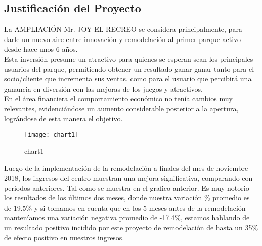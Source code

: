 \documentclass[11pt,a4paper,roman]{article}
\begin{document}
\subsection{Justificación del Proyecto}
La AMPLIACIÓN Mr. JOY EL RECREO se considera principalmente, para darle un nuevo aire entre innovación y remodelación al primer parque activo desde hace unos 6 años.\\[0.25in]
Esta inversión presume un atractivo para quienes se esperan sean  los principales usuarios del parque, permitiendo obtener un resultado ganar-ganar tanto para el socio/cliente que incrementa sus ventas, como para el usuario que percibirá una ganancia en diversión con las mejoras de los juegos y atractivos.\\[0.25in]
En el área financiera el comportamiento económico no tenía cambios muy relevantes, evidenciándose un aumento considerable posterior a la apertura, lográndose de esta manera el objetivo.\\[0.25in]

\begin{figure}[h]
	\centering
	\texttt{[image: chart1]}
	\caption[chart1]{chart1}
	\label{fig:chart1}
\end{figure}

\noindent
Luego de la implementación de la remodelación a finales del mes de noviembre 2018, los ingresos del centro muestran una mejora significativa, comparando con periodos anteriores. Tal como se muestra en el grafico anterior. Es muy notorio los resultados de los últimos dos meses, donde nuestra variación \% promedio es de 19.5\% y si tomamos en cuenta que en los 5 meses antes de la remodelación manteníamos una variación negativa promedio de -17.4\%, estamos hablando de un resultado positivo incidido por este proyecto de remodelación de hasta un 35\% de efecto positivo en nuestros ingresos.\\[0.25in]
\end{document}
